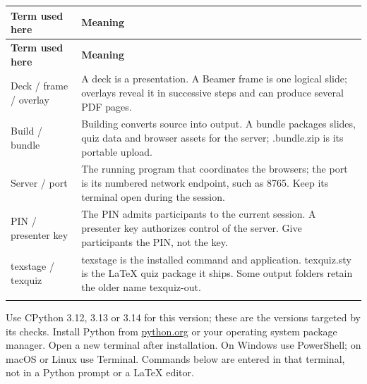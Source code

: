 \documentclass[a4paper,11pt]{article}
\begin{document}
{\small
\begin{longtable}{>{\raggedright\arraybackslash}p{}>{\raggedright\arraybackslash}p{}}
\toprule
\textbf{Term used here} & \textbf{Meaning} \\
\midrule
\endfirsthead
\toprule
\textbf{Term used here} & \textbf{Meaning} \\
\midrule
\endhead
\midrule
\endfoot
\bottomrule
\endlastfoot
Deck /\allowbreak{} frame /\allowbreak{} overlay & A deck is a presentation.\allowbreak{} A Beamer frame is one logical slide; overlays reveal it in successive steps and can produce several PDF pages. \\ \addlinespace[3pt]
Build /\allowbreak{} bundle & Building converts source into output.\allowbreak{} A bundle packages slides, quiz data and browser assets for the server; .\allowbreak{}bundle.\allowbreak{}zip is its portable upload. \\ \addlinespace[3pt]
Server /\allowbreak{} port & The running program that coordinates the browsers; the port is its numbered network endpoint, such as 8765.\allowbreak{} Keep its terminal open during the session. \\ \addlinespace[3pt]
PIN /\allowbreak{} presenter key & The PIN admits participants to the current session.\allowbreak{} A presenter key authorizes control of the server.\allowbreak{} Give participants the PIN, not the key. \\ \addlinespace[3pt]
texstage /\allowbreak{} texquiz & texstage is the installed command and application.\allowbreak{} texquiz.\allowbreak{}sty is the LaTeX quiz package it ships.\allowbreak{} Some output folders retain the older name texquiz-\allowbreak{}out. \\ \addlinespace[3pt]
\end{longtable}}

\label{sec:install-python-and-obtain-the-source}
Use CPython 3.\allowbreak{}12, 3.\allowbreak{}13 or 3.\allowbreak{}14 for this version; these are the versions targeted by its checks.\allowbreak{} Install Python from \href{https://www.python.org/downloads/}{python.\allowbreak{}org} or your operating system package manager.\allowbreak{} Open a new terminal after installation.\allowbreak{} On Windows use PowerShell; on macOS or Linux use Terminal.\allowbreak{} Commands below are entered in that terminal, not in a Python prompt or a LaTeX editor.\par
\end{document}
